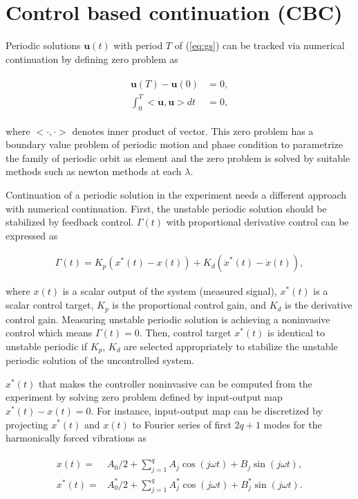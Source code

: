 \documentclass[openacc]{rsproca_new}%
\def\vec#1{\ensuremath{\mathbf{#1}}}
\newcommand{\Eref}[1]{(\ref{#1})}
\begin{document}
\section{Control based continuation (CBC)}\label{CBC}

Periodic solutions $\vec{u}(t)$ with period $T$ of \Eref{eq:gs} can be tracked via numerical continuation by defining zero problem as

\begin{align}\label{eq:zp2}
  \begin{split}
 \vec{u}(T)-\vec{u}(0)&=0,\\
   \int_{0}^{T} <\dot {\vec{u}}, \vec{u}> dt&=0,
\end{split}
\end{align}

\noindent where $<\cdot,\cdot>$ denotes inner product of vector. This zero problem has a boundary value problem of periodic motion and phase condition to parametrize the family of periodic orbit as element and the zero problem is solved by suitable methods such as newton methods at each $\lambda$.


Continuation of a periodic solution in the experiment needs a different approach with numerical continuation. First, the unstable periodic solution should be stabilized by feedback control. $\Gamma(t)$ with proportional derivative control can be expressed as

\begin{align}
  \Gamma(t)=K_p(x^*(t)-x(t))+K_d(\dot x^*(t)-\dot x(t)),
\end{align}

\noindent where $x(t)$ is a scalar output of the system (measured signal), $x^*(t)$ is a scalar control target, $K_p$ is the proportional control gain, and $K_d$ is the derivative control gain. Measuring unstable periodic solution is achieving a noninvasive control which means $\Gamma(t)=0$. Then, control target $x^*(t)$ is identical to unstable periodic if $K_p$, $K_d$ are selected appropriately to stabilize the unstable periodic solution of the uncontrolled system.

$x^*(t)$ that makes the controller noninvasive can be computed from the experiment by solving zero problem defined by input-output map $x^*(t)-x(t)=0$. For instance, input-output map can be discretized by projecting $x^*(t)$ and $x(t)$ to Fourier series of first $2q+1$ modes for the harmonically forced vibrations as

\begin{align}\label{eq:dis}
  \begin{split}
  x(t)=&A_0/2+  \sum_{j=1}^{q} A_j \cos (j\omega t)+B_j \sin (j\omega t),\\
  x^*(t)=&A_0^*/2+  \sum_{j=1}^{q} A^*_j \cos (j\omega t)+B^*_j \sin (j\omega t).
\end{split}
\end{align}
\end{document}
